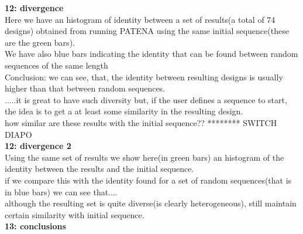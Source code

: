 \documentclass[a4paper,10pt]{article}
\begin{document}
\textbf{12: divergence}\\
Here we have an histogram of identity between a set of results(a total of 74 designs) obtained from running PATENA using the same initial sequence(these are the green bars).\\
We have also blue bars indicating the identity that can be found between random sequences of the same length\\
Conclusion: we can see, that, the identity between resulting designs is usually higher than that between random sequences.\\
.....it is great to have such diversity but, if the user defines a sequence to start, the idea is to get a at least some similarity in the resulting design. \\
how similar are these results with the initial sequence??  ******** SWITCH DIAPO\\


\textbf{12: divergence 2}\\
Using the same set of results we show here(in green bars) an histogram of the identity between the results and the initial sequence.\\
if we compare this with the identity found for a set of random sequences(that is in blue bars) we can see that....\\
although the resulting set is quite diverse(is clearly heterogeneous), still maintain certain similarity with initial sequence.\\



\textbf{13: conclusions}
\end{document}
